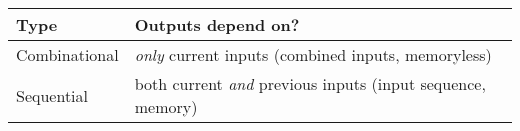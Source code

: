 \begin{tabular}[h]{ll}
  \hline
  Type & Outputs depend on?  \\
  \hline
  Combinational & \emph{only} current inputs (combined inputs, memoryless)  \\
  Sequential & both current \emph{and} previous inputs (input sequence, memory) \\
  \hline
\end{tabular}
